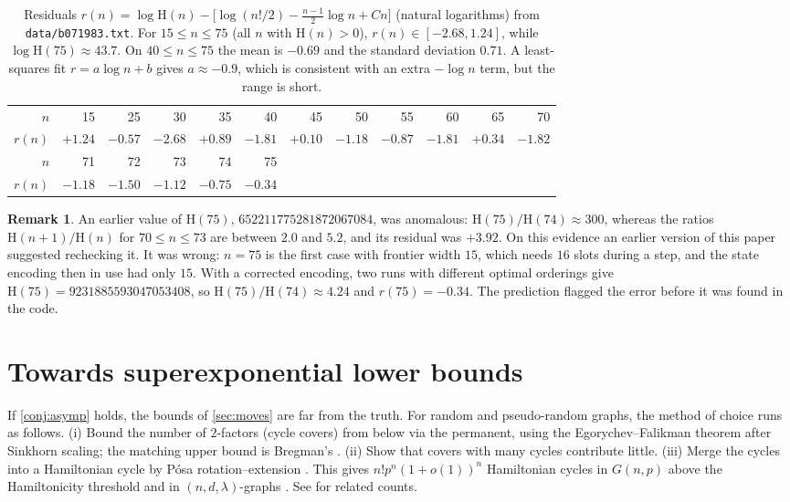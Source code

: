 \documentclass[11pt]{amsart}
\theoremstyle{definition}
\newtheorem{remark}[theorem]{Remark}
\newcommand{\Ham}{\mathrm{H}}
\begin{document}
\begin{table}[h]
\centering\small
\begin{tabular}{rrrrrrrrrrrr}
\toprule
$n$ & 15 & 25 & 30 & 35 & 40 & 45 & 50 & 55 & 60 & 65 & 70\\
$r(n)$ & $+1.24$ & $-0.57$ & $-2.68$ & $+0.89$ & $-1.81$ & $+0.10$ & $-1.18$ & $-0.87$ & $-1.81$ & $+0.34$ & $-1.82$\\
\midrule
$n$ & 71 & 72 & 73 & 74 & 75\\
$r(n)$ & $-1.18$ & $-1.50$ & $-1.12$ & $-0.75$ & $-0.34$\\
\bottomrule
\end{tabular}
\caption{Residuals $r(n)=\log\Ham(n)-\bigl[\log(n!/2)-\frac{n-1}2\log n+Cn\bigr]$
(natural logarithms) from \texttt{data/b071983.txt}. For $15\le n\le75$ (all $n$
with $\Ham(n)>0$), $r(n)\in[-2.68,1.24]$, while $\log\Ham(75)\approx43.7$. On
$40\le n\le75$ the mean is $-0.69$ and the standard deviation $0.71$. A least-squares
fit $r=a\log n+b$ gives $a\approx-0.9$, which is consistent with an extra $-\log n$
term, but the range is short.}
\label{tab:resid}
\end{table}

\begin{remark}
An earlier value of $\Ham(75)$, $652211775281872067084$, was anomalous:
$\Ham(75)/\Ham(74)\approx300$, whereas the ratios $\Ham(n+1)/\Ham(n)$ for $70\le n\le73$
are between $2.0$ and $5.2$, and its residual was $+3.92$. On this evidence an earlier
version of this paper suggested rechecking it. It was wrong: $n=75$ is the first case
with frontier width $15$, which needs $16$ slots during a step, and the state encoding
then in use had only $15$. With a corrected encoding, two runs with different optimal
orderings give $\Ham(75)=9231885593047053408$, so $\Ham(75)/\Ham(74)\approx4.24$ and
$r(75)=-0.34$. The prediction flagged the error before it was found in the code.
\end{remark}

\section{Towards superexponential lower bounds}\label{sec:superexp}

If \cref{conj:asymp} holds, the bounds of \cref{sec:moves} are far from the truth.
For random and pseudo-random graphs, the method of choice runs as follows.
(i) Bound the number of $2$-factors (cycle covers) from below via the permanent, using
the Egorychev--Falikman theorem \cite{Egorychev,Falikman} after Sinkhorn scaling; the
matching upper bound is Bregman's \cite{Bregman}. (ii) Show that covers with many
cycles contribute little. (iii) Merge the cycles into a Hamiltonian cycle by
P\'osa rotation--extension \cite{Posa}. This gives $n!p^n(1+o(1))^n$ Hamiltonian cycles in
$G(n,p)$ above the Hamiltonicity threshold \cite{GlebovKrivelevich} and in
$(n,d,\lambda)$-graphs \cite{Krivelevich}. See \cite{CooperFrieze,CucklerKahn,FKS} for
related counts.
\end{document}
